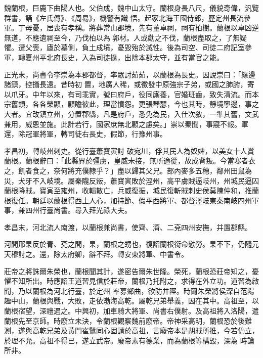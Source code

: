 
\begin{pinyinscope}

 魏蘭根，巨鹿下曲陽人也。父伯成，魏中山太守。蘭根身長八尺，儀貌奇偉，汎覽群書，誦《左氏傳》、《周易》，機警有識
 悟。起家北海王國侍郎，歷定州長流參軍。丁母憂，居喪有孝稱。將葬常山郡境，先有董卓祠，祠有柏樹。蘭根以卓凶逆無道，不應遺祠至今，乃伐柏以為郭材。人或勸之不伐，蘭根盡取之，了無疑懼。遭父喪，廬於墓側，負土成墳，憂毀殆於滅性。後為司空、司徒二府記室參軍，轉夏州平北府長史，入為司徒掾，出除本郡太守，並有當官之能。



 正光末，尚書令李崇為本郡都督，率眾討茹茹，以蘭根為長史。因說崇曰：「緣邊諸鎮，控攝長遠。昔時初
 置，地廣人稀，或徵發中原強宗子弟，或國之肺腑，寄以爪牙。中年以來，有司乖實，號曰府戶，役同廝養，官婚班齒，致失清流。而本宗舊類，各各榮顯，顧瞻彼此，理當憤怨。更張琴瑟，今也其時，靜境寧邊，事之大者。宜改鎮立州，分置郡縣，凡是府戶，悉免為民，入仕次敘，一準其舊，文武兼用，威恩並施。此計若行，國家庶無北顧之慮矣。」崇以秦聞，事寢不報。軍還，除冠軍將軍，轉司徒右長史，假節，行豫州事。



 孝昌初，轉岐州刺史。從行臺蕭寶寅討
 破宛川，俘其民人為奴婢，以美女十人賞蘭根。蘭根辭曰：「此縣界於彊虜，皇威未接，無所適從，故成背叛。今當寒者衣之，飢者食之，奈何將充僕隸乎？」盡以歸其父兄。部內麥多五穗，鄰州田鼠為災，犬牙不入岐境。屬秦隴反叛，蕭寶寅敗於涇州，高平虜賊逼岐州，州城民逼囚蘭根降賊。寶寅至雍州，收輯散亡，兵威復振，城民復斬賊刺史侯莫陳仲和，推蘭根復任。朝廷以蘭根得西土人心，加持節、假平西將軍、都督涇岐東秦南岐四州軍
 事，兼四州行臺尚書。尋入拜光祿大夫。



 孝昌末，河北流人南渡，以蘭根兼尚書，使齊、濟、二兗四州安撫，并置郡縣。



 河間邢杲反於青、兗之間，杲，蘭根之甥也，復詔蘭根銜命慰勞。杲不下，仍隨元天穆討之。還，除太府卿，辭不拜。轉安東將軍、中書令。



 莊帝之將誅爾朱榮也，蘭根聞其計，遂密告爾朱世隆。榮死，蘭根恐莊帝知之，憂懼不知所出。時應詔王道習見信於莊帝，蘭根乃托附之，求得在外立功。道習為啟聞，乃以蘭根為河北行臺，於定州
 率募鄉曲，欲防井陘。時爾朱榮將侯深自范陽趣中山，蘭根與戰，大敗，走依渤海高乾。屬乾兄弟舉義，因在其中。高祖至，以蘭根宿望，深禮遇之。中興初，加車騎大將軍、尚書右僕射。及高祖將入洛陽，遣蘭根先至京師。時廢立未決，令蘭根觀察魏前廢帝。帝神采高明，蘭根恐於後難測，遂與高乾兄弟及黃門崔鷿同心固請於高祖，言廢帝本是胡賊所推，今若仍立，於理不允。高祖不得已，遂立武帝。廢帝素有德業，而為蘭根等構毀，深為
 時論所非。




\end{pinyinscope}
